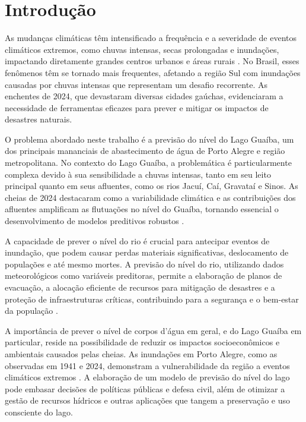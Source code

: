 \chapter{Introdução}
As mudanças climáticas têm intensificado a frequência e a severidade de eventos climáticos extremos, como chuvas intensas, secas prolongadas e inundações, impactando diretamente grandes centros urbanos e áreas rurais \cite{veja2024}. No Brasil, esses fenômenos têm se tornado mais frequentes, afetando a região Sul com inundações causadas por chuvas intensas que representam um desafio recorrente. As enchentes de 2024, que devastaram diversas cidades gaúchas, evidenciaram a necessidade de ferramentas eficazes para prever e mitigar os impactos de desastres naturais.

O problema abordado neste trabalho é a previsão do nível do Lago Guaíba, um dos principais mananciais de abastecimento de água de Porto Alegre e região metropolitana. No contexto do Lago Guaíba, a problemática é particularmente complexa devido à sua sensibilidade a chuvas intensas, tanto em seu leito principal quanto em seus afluentes, como os rios Jacuí, Caí, Gravataí e Sinos. As cheias de 2024 destacaram como a variabilidade climática e as contribuições dos afluentes amplificam as flutuações no nível do Guaíba, tornando essencial o desenvolvimento de modelos preditivos robustos \cite{veja2024}.

A capacidade de prever o nível do rio é crucial para antecipar eventos de inundação, que podem causar perdas materiais significativas, deslocamento de populações e até mesmo mortes. A previsão do nível do rio, utilizando dados meteorológicos como variáveis preditoras, permite a elaboração de planos de evacuação, a alocação eficiente de recursos para mitigação de desastres e a proteção de infraestruturas críticas, contribuindo para a segurança e o bem-estar da população \cite{andrade2017}.

A importância de prever o nível de corpos d'água em geral, e do Lago Guaíba em particular, reside na possibilidade de reduzir os impactos socioeconômicos e ambientais causados pelas cheias. As inundações em Porto Alegre, como as observadas em 1941 e 2024, demonstram a vulnerabilidade da região a eventos climáticos extremos \cite{veja2024}. A elaboração de um modelo de previsão do nível do lago pode embasar decisões de políticas públicas e defesa civil, além de otimizar a gestão de recursos hídricos e outras aplicações que tangem a preservação e uso consciente do lago.

